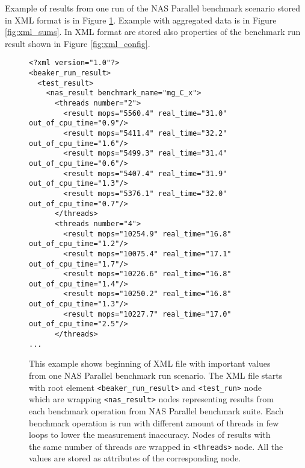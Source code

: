 
Example of results from one run of the NAS Parallel benchmark scenario stored in
XML format is in Figure \ref{fig:xml_result}. Example with aggregated
data is in Figure \ref{fig:xml_sums}. In XML format are stored also properties
of the benchmark run result shown in Figure \ref{fig:xml_config}.

\begin{figure}
  \small
  \begin{verbatim}
<?xml version="1.0"?>
<beaker_run_result>
  <test_result>
    <nas_result benchmark_name="mg_C_x">
      <threads number="2">
        <result mops="5560.4" real_time="31.0" out_of_cpu_time="0.9"/>
        <result mops="5411.4" real_time="32.2" out_of_cpu_time="1.6"/>
        <result mops="5499.3" real_time="31.4" out_of_cpu_time="0.6"/>
        <result mops="5407.4" real_time="31.9" out_of_cpu_time="1.3"/>
        <result mops="5376.1" real_time="32.0" out_of_cpu_time="0.7"/>
      </threads>
      <threads number="4">
        <result mops="10254.9" real_time="16.8" out_of_cpu_time="1.2"/>
        <result mops="10075.4" real_time="17.1" out_of_cpu_time="1.7"/>
        <result mops="10226.6" real_time="16.8" out_of_cpu_time="1.4"/>
        <result mops="10250.2" real_time="16.8" out_of_cpu_time="1.3"/>
        <result mops="10227.7" real_time="17.0" out_of_cpu_time="2.5"/>
      </threads>
...
\end{verbatim}
  \normalsize
  \caption{This example shows beginning of XML file with important values from one NAS
    Parallel benchmark run scenario. The XML file starts with root element
    \texttt{<beaker\_run\_result>} and \texttt{<test\_run>} node which are wrapping
    \texttt{<nas\_result>} nodes representing results from each benchmark operation
    from NAS Parallel benchmark suite. Each benchmark operation is run with
    different amount of threads in few loops to lower the measurement inaccuracy.
    Nodes of results with the same number of threads are wrapped in
    \texttt{<threads>} node. All the values are stored as attributes of the
    corresponding node.}
  \label{fig:xml_result}
\end{figure}

